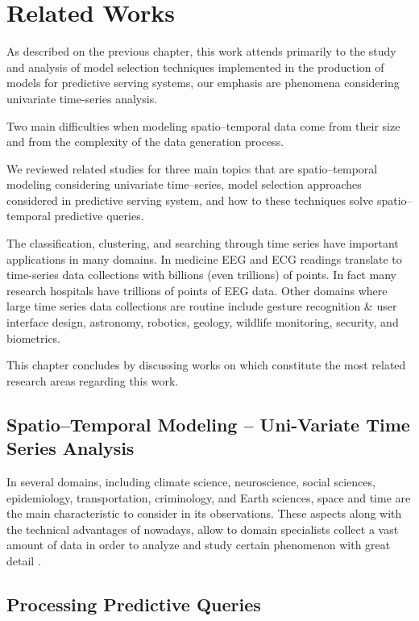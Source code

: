 \chapter{Related Works}\label{chapter_Related_Works}

As described on the previous chapter, this work attends primarily to the study and analysis of model selection techniques implemented in the production of models for predictive serving systems, our emphasis are phenomena considering univariate time-series analysis. 

Two main difficulties when modeling spatio--temporal data come from their size and from the complexity of the data generation process. \cite{}

We reviewed related studies for three main topics that are spatio--temporal modeling considering univariate time--series, model selection approaches considered in predictive serving system, and how to these techniques solve spatio--temporal predictive queries.

The classification, clustering, and searching through time series have important applications in many domains. In medicine EEG and ECG readings translate to time-series data collections with billions (even trillions) of points. In fact many research hospitals have trillions of points of EEG data. Other domains where large time series data collections are routine include gesture recognition \& user interface design, astronomy, robotics, geology, wildlife monitoring, security, and biometrics. 

This chapter concludes by discussing works on which constitute the most related research areas regarding this work.

\section{Spatio--Temporal Modeling -- Uni-Variate Time Series Analysis}
\label{Sec:STModeling}


In several domains, including climate science, neuroscience, social sciences, epidemiology, transportation, criminology, and Earth sciences, space and time are the main characteristic to consider in its observations. These aspects along with the technical advantages of nowadays, allow to domain specialists collect a vast amount of data in order to analyze and study certain phenomenon with great detail \cite{}.


\section{Processing Predictive Queries}
\label{Sec:RelatedWorksQueries}

